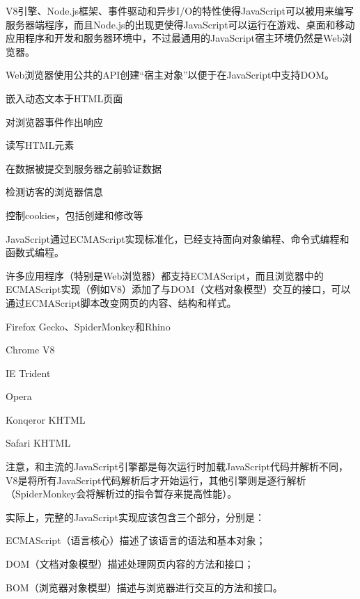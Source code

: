 V8引擎、Node.js框架、事件驱动和异步I/O的特性使得JavaScript可以被用来编写服务器端程序，而且Node.js的出现更使得JavaScript可以运行在游戏、桌面和移动应用程序和开发和服务器环境中，不过最通用的JavaScript宿主环境仍然是Web浏览器。

Web浏览器使用公共的API创建“宿主对象”以便于在JavaScript中支持DOM。

\begin{compactitem}
\item 嵌入动态文本于HTML页面
\item 对浏览器事件作出响应
\item 读写HTML元素
\item 在数据被提交到服务器之前验证数据
\item 检测访客的浏览器信息
\item 控制cookies，包括创建和修改等
\end{compactitem}





JavaScript通过ECMAScript实现标准化，已经支持面向对象编程、命令式编程和函数式编程。

许多应用程序（特别是Web浏览器）都支持ECMAScript，而且浏览器中的ECMAScript实现（例如V8）添加了与DOM（文档对象模型）交互的接口，可以通过ECMAScript脚本改变网页的内容、结构和样式。

\begin{compactitem}
\item Firefox Gecko、SpiderMonkey和Rhino
\item Chrome V8
\item IE Trident
\item Opera
\item Konqeror KHTML
\item  Safari KHTML
\end{compactitem}



注意，和主流的JavaScript引擎都是每次运行时加载JavaScript代码并解析不同，V8是将所有JavaScript代码解析后才开始运行，其他引擎则是逐行解析（SpiderMonkey会将解析过的指令暂存来提高性能）。

实际上，完整的JavaScript实现应该包含三个部分，分别是：

\begin{compactenum}
\item ECMAScript（语言核心）描述了该语言的语法和基本对象；
\item DOM（文档对象模型）描述处理网页内容的方法和接口；
\item BOM（浏览器对象模型）描述与浏览器进行交互的方法和接口。
\end{compactenum}

